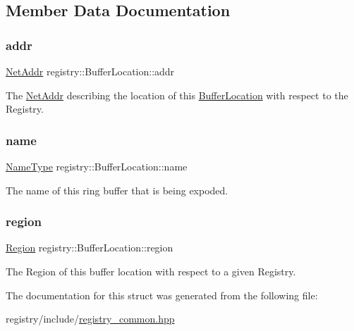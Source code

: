 \subsection{Member Data Documentation}
\mbox{\label{structregistry_1_1BufferLocation_ad22f3b9cd359ad88ad3ddcad69fdb740}} 
\subsubsection{\texorpdfstring{addr}{addr}}
{\footnotesize\ttfamily \hyperlink{namespaceregistry_a2d7eac31eb792025667bcebdfe93dbf2}{Net\+Addr} registry\+::\+Buffer\+Location\+::addr}

The \hyperlink{classNetAddr}{Net\+Addr} describing the location of this \hyperlink{structregistry_1_1BufferLocation}{Buffer\+Location} with respect to the Registry. \mbox{\label{structregistry_1_1BufferLocation_a9941e0d8dceeb136a95c50bef3792082}} 
\subsubsection{\texorpdfstring{name}{name}}
{\footnotesize\ttfamily \hyperlink{structregistry_1_1BufferLocation_ad3c2279012b74798fa1e348507020fa4}{Name\+Type} registry\+::\+Buffer\+Location\+::name}



The name of this ring buffer that is being expoded. 

\mbox{\label{structregistry_1_1BufferLocation_ad05676e193d5259c84e53f7037ed3878}} 
\subsubsection{\texorpdfstring{region}{region}}
{\footnotesize\ttfamily \hyperlink{structregistry_1_1BufferLocation_a07b156ecd0690dbebb5cba36d4d23ba0}{Region} registry\+::\+Buffer\+Location\+::region}

The Region of this buffer location with respect to a given Registry. 

The documentation for this struct was generated from the following file\+:\begin{DoxyCompactItemize}
\item 
registry/include/\hyperlink{registry__common_8hpp}{registry\+\_\+common.\+hpp}\end{DoxyCompactItemize}
